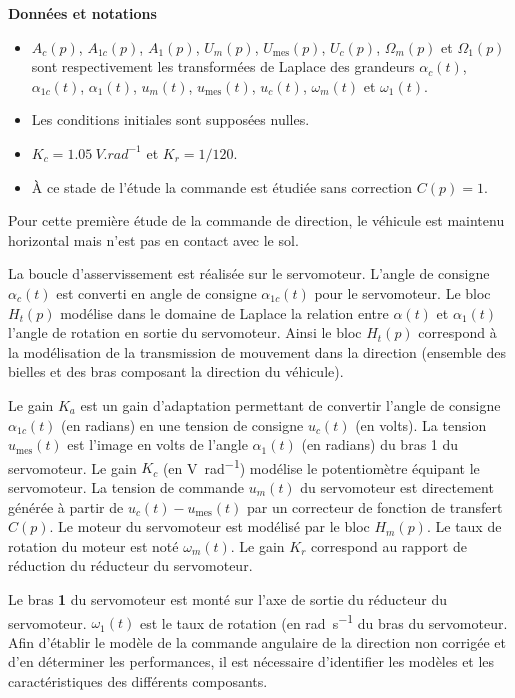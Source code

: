 \textbf{Données et notations}
\begin{itemize}
\item $A_{c}(p)$, $A_{1c}(p)$, $A_{1}(p)$, $U_m(p)$, $U_{\text{mes}}(p)$, $U_c(p)$, $\Omega_m(p)$ et 
$\Omega_1(p)$ sont respectivement les transformées de Laplace des grandeurs 
$\alpha_{c}(t)$, $\alpha_{1c}(t)$, $\alpha_{1}(t)$, $u_m(t)$, $u_{\text{mes}}(t)$, $u_c(t)$, $\omega_m(t)$ et $\omega_1(t)$.
\item Les conditions initiales sont supposées nulles.
\item $K_c = \SI{1,05}{V.rad^{-1}}$ et $K_r=1/120$.
\item À ce stade de l’étude la commande est étudiée sans correction $C(p)=1$.
\end{itemize}
Pour cette première étude de la commande de direction, le véhicule est maintenu horizontal mais n’est pas en
contact avec le sol.

La boucle d’asservissement est réalisée sur le servomoteur. L’angle de consigne $\alpha_{c}(t)$ est converti en angle de
consigne $\alpha_{1c}(t)$ pour le servomoteur. Le bloc $H_t(p)$ modélise dans le domaine de Laplace la relation entre $\alpha(t)$ et $\alpha_1(t)$ l’angle de rotation en sortie du servomoteur. Ainsi le bloc $H_t(p)$ correspond à la modélisation de la transmission de mouvement dans la direction (ensemble des bielles et des bras composant la direction du véhicule).

Le gain $K_a$ est un gain d’adaptation permettant de convertir l’angle de consigne $\alpha_{1c}(t)$ (en radians) en une tension de consigne $u_{c}(t)$ (en volts). La tension $u_{\text{mes}}(t)$ est l’image en volts de l’angle $\alpha_1(t)$ (en radians) du bras
1 du servomoteur. Le gain $K_c$ 
(en \si{V.rad^{-1}}) modélise le potentiomètre équipant le servomoteur.
La tension de commande $u_{m}(t)$ du servomoteur est directement générée à partir de $u_{c}(t) -u_{\text{mes}}(t)$ par un
correcteur de fonction de transfert $C(p)$. Le moteur du servomoteur est modélisé par le bloc $H_m(p)$. Le taux de rotation du moteur est noté $\omega_m(t)$. Le gain $K_r$ correspond au rapport de réduction du réducteur du servomoteur.

Le bras \textbf{1} du servomoteur est monté sur l’axe de sortie du réducteur du servomoteur. $\omega_1(t)$ est le taux de rotation (en \si{rad.s^{-1}} du bras du servomoteur.
Afin d’établir le modèle de la commande angulaire de la direction non corrigée et d’en déterminer les performances, il est nécessaire d’identifier les modèles et les caractéristiques des différents composants.

